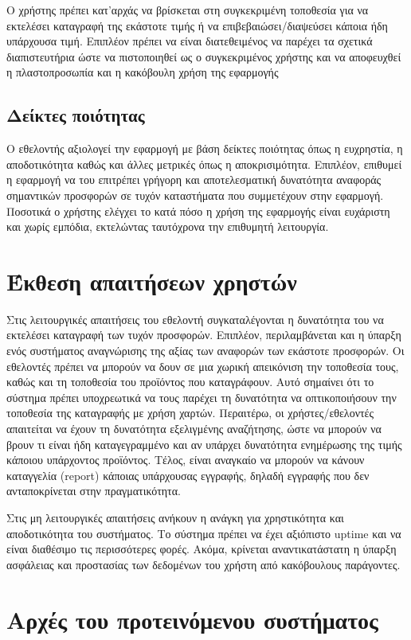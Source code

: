 \documentclass[a4paper,oneside, 12pt]{article}
\begin{document}
Ο χρήστης πρέπει κατ’αρχάς να βρίσκεται στη συγκεκριμένη τοποθεσία για να εκτελέσει καταγραφή της εκάστοτε τιμής ή να επιβεβαιώσει/διαψεύσει κάποια ήδη υπάρχουσα τιμή. Επιπλέον πρέπει να είναι διατεθειμένος να παρέχει τα σχετικά διαπιστευτήρια ώστε να πιστοποιηθεί ως ο συγκεκριμένος χρήστης και να αποφευχθεί η πλαστοπροσωπία και η κακόβουλη χρήση της εφαρμογής  

\subsection{Δείκτες ποιότητας}
Ο εθελοντής αξιολογεί την εφαρμογή με βάση δείκτες ποιότητας όπως η ευχρηστία, η αποδοτικότητα καθώς και άλλες μετρικές όπως η αποκρισιμότητα. Επιπλέον, επιθυμεί η εφαρμογή να του επιτρέπει γρήγορη και αποτελεσματική δυνατότητα αναφοράς σημαντικών προσφορών σε τυχόν καταστήματα που συμμετέχουν στην εφαρμογή. Ποσοτικά ο χρήστης ελέγχει το κατά πόσο η χρήση της εφαρμογής είναι ευχάριστη και χωρίς εμπόδια, εκτελώντας ταυτόχρονα την επιθυμητή λειτουργία.

\section{Έκθεση απαιτήσεων χρηστών}
Στις λειτουργικές απαιτήσεις του εθελοντή συγκαταλέγονται η δυνατότητα του να εκτελέσει καταγραφή των τυχόν προσφορών. Επιπλέον, περιλαμβάνεται και η ύπαρξη ενός συστήματος αναγνώρισης της αξίας των αναφορών των εκάστοτε προσφορών. Οι εθελοντές πρέπει να μπορούν να δουν σε μια χωρική απεικόνιση την τοποθεσία τους, καθώς και τη τοποθεσία του προϊόντος που καταγράφουν. Αυτό σημαίνει ότι το σύστημα πρέπει υποχρεωτικά να τους παρέχει τη δυνατότητα να οπτικοποιήσουν την τοποθεσία της καταγραφής με χρήση χαρτών. Περαιτέρω, οι χρήστες/εθελοντές απαιτείται να έχουν τη δυνατότητα εξελιγμένης αναζήτησης, ώστε να μπορούν να βρουν τι είναι ήδη καταγεγραμμένο και αν υπάρχει δυνατότητα ενημέρωσης της τιμής κάποιου υπάρχοντος προϊόντος. Τέλος, είναι αναγκαίο να μπορούν να κάνουν καταγγελία (report) κάποιας υπάρχουσας εγγραφής, δηλαδή εγγραφής που δεν ανταποκρίνεται στην πραγματικότητα.

Στις μη λειτουργικές απαιτήσεις ανήκουν η ανάγκη για χρηστικότητα και αποδοτικότητα του συστήματος. Το σύστημα πρέπει να έχει αξιόπιστο uptime και να είναι διαθέσιμο τις περισσότερες φορές. Ακόμα, κρίνεται αναντικατάστατη η ύπαρξη ασφάλειας και προστασίας των δεδομένων του χρήστη από κακόβουλους παράγοντες.   

\section{Αρχές του προτεινόμενου συστήματος}
\end{document}
